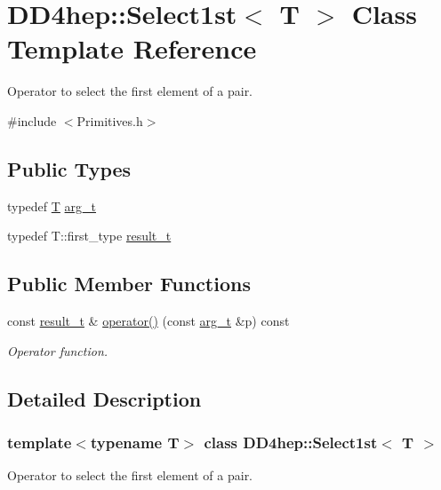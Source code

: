 \hypertarget{class_d_d4hep_1_1_select1st}{
\section{DD4hep::Select1st$<$ T $>$ Class Template Reference}
\label{class_d_d4hep_1_1_select1st}
}


Operator to select the first element of a pair.  


{\ttfamily \#include $<$Primitives.h$>$}\subsection*{Public Types}
\begin{DoxyCompactItemize}
\item 
typedef \hyperlink{class_t}{T} \hyperlink{class_d_d4hep_1_1_select1st_a271f38874bb7bcaf5867dc6d4ad356d1}{arg\_\-t}
\item 
typedef T::first\_\-type \hyperlink{class_d_d4hep_1_1_select1st_a39139f045fd65227afbed9a441a5eaea}{result\_\-t}
\end{DoxyCompactItemize}
\subsection*{Public Member Functions}
\begin{DoxyCompactItemize}
\item 
const \hyperlink{class_d_d4hep_1_1_select1st_a39139f045fd65227afbed9a441a5eaea}{result\_\-t} \& \hyperlink{class_d_d4hep_1_1_select1st_a62ebacc3c81d9e27996e7a7f47f8d92d}{operator()} (const \hyperlink{class_t}{arg\_\-t} \&p) const 
\begin{DoxyCompactList}\small\item\em Operator function. \item\end{DoxyCompactList}\end{DoxyCompactItemize}


\subsection{Detailed Description}
\subsubsection*{template$<$typename T$>$ class DD4hep::Select1st$<$ T $>$}

Operator to select the first element of a pair. 


